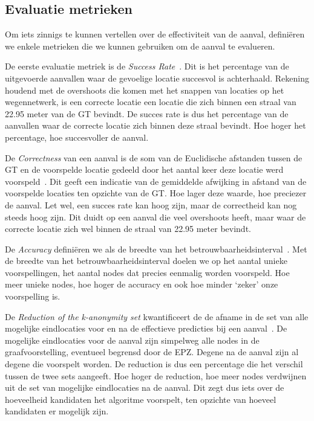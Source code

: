 \subsection{Evaluatie metrieken}
Om iets zinnigs te kunnen vertellen over de effectiviteit van de aanval,
definiëren we enkele metrieken die we kunnen gebruiken om de aanval te
evalueren.

De eerste evaluatie metriek is de \textit{Success Rate}~\cite{Dhondt}. Dit is
het percentage van de uitgevoerde aanvallen waar de gevoelige locatie succesvol
is achterhaald. Rekening houdend met de overshoots die komen met het snappen
van locaties op het wegennetwerk, is een correcte locatie een locatie die zich
binnen een straal van 22.95 meter van de \ac{GT} bevindt. De succes rate is dus
het percentage van de aanvallen waar de correcte locatie zich binnen deze
straal bevindt. Hoe hoger het percentage, hoe succesvoller de aanval.

De \textit{Correctness} van een aanval is de som van de Euclidische afstanden
tussen de \ac{GT} en de voorspelde locatie gedeeld door het aantal keer deze
locatie werd voorspeld~\cite{Dhondt, Verdonck_2022}. Dit geeft een indicatie
van de gemiddelde afwijking in afstand van de voorspelde locaties ten opzichte
van de \ac{GT}. Hoe lager deze waarde, hoe preciezer de aanval. Let wel, een
succes rate kan hoog zijn, maar de correctheid kan nog steeds hoog zijn. Dit
duidt op een aanval die veel overshoots heeft, maar waar de correcte locatie
zich wel binnen de straal van 22.95 meter bevindt.

De \textit{Accuracy} definiëren we als de breedte van het
betrouwbaarheidsinterval~\cite{Dhondt, Verdonck_2022}. Met de breedte van het
betrouwbaarheidsinterval doelen we op het aantal unieke voorspellingen, het
aantal nodes dat precies eenmalig worden voorspeld. Hoe meer unieke nodes, hoe
hoger de accuracy en ook hoe minder `zeker' onze voorspelling is.

De \textit{Reduction of the k-anonymity set} kwantificeert de de afname in de
set van alle mogelijke eindlocaties voor en na de effectieve predicties bij een
aanval~\cite{Dhondt, Verdonck_2022}. De mogelijke eindlocaties voor de aanval
zijn simpelweg alle nodes in de graafvoorstelling, eventueel begrensd door de
\ac{EPZ}. Degene na de aanval zijn al degene die voorspelt worden. De reduction
is dus een percentage die het verschil tussen de twee sets aangeeft. Hoe hoger
de reduction, hoe meer nodes verdwijnen uit de set van mogelijke eindlocaties
na de aanval. Dit zegt dus iets over de hoeveelheid kandidaten het algoritme
voorspelt, ten opzichte van hoeveel kandidaten er mogelijk zijn.

